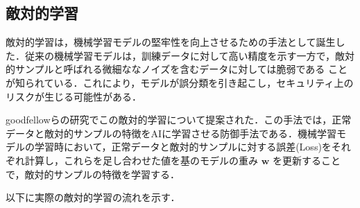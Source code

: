 
\subsection{敵対的学習}
敵対的学習は，機械学習モデルの堅牢性を向上させるための手法として誕生した．従来の機械学習モデルは，訓練データに対して高い精度を示す一方で，敵対的サンプルと呼ばれる微細ななノイズを含むデータに対しては脆弱である
ことが知られている．これにより，モデルが誤分類を引き起こし，セキュリティ上のリスクが生じる可能性がある．

goodfellowらの研究\cite{goodfellow2015explaining}でこの敵対的学習について提案された．この手法では，正常データと敵対的サンプルの特徴をAIに学習させる防御手法である．機械学習モデルの学習時において，正常データと敵対的サンプルに対する誤差(Loss)をそれぞれ計算し，これらを足し合わせた値を基のモデルの重み $\bm{w}$ を更新することで，敵対的サンプルの特徴を学習する．

以下に実際の敵対的学習の流れを示す．\cite{MBSD-AdversarialTraining}

